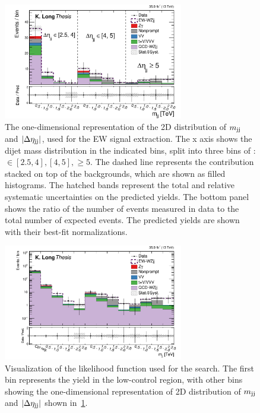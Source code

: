 \begin{figure}[htbp]
  \centering
   \includegraphics[width=0.7\textwidth]{figures/AnalysisProcedure/mjj_etajj_unrolled_Expected.pdf}\qquad
  \caption{
    The one-dimensional representation of the 2D distribution of 
    $m_{\mathrm{jj}}$ and $\left|\Delta\eta_{\mathrm{jj}}\right|$, used for the EW 
    signal extraction. The x axis shows the dijet mass distribution
    in the indicated bins, split into three bins of {\etajj }: {\etajj} $\in [2.5, 4], [4, 5], \ge 5$.
    The dashed line represents the \EWWZ contribution stacked
    on top of the backgrounds, which are shown as filled histograms. 
    The hatched bands represent the total and relative 
    systematic uncertainties on the predicted yields.
    The bottom panel shows the ratio of the number of events measured in data to the total 
    number of expected events. 
    The predicted yields are shown with their best-fit normalizations.
}
\label{fig:2DfitDistribution}
\end{figure}

\begin{figure}[htbp]
  \centering
   \includegraphics[width=0.7\textwidth]{figures/AnalysisProcedure/mjj_etajj_unrolled_wCR_Expected.pdf}\qquad
  \caption{
    Visualization of the likelihood function used for the \EWWZ search.
    The first bin represents the yield in the low-\mjj control region,
    with other bins showing the one-dimensional representation of
    2D distribution of 
    $m_{\mathrm{jj}}$ and $\left|\Delta\eta_{\mathrm{jj}}\right|$ shown in~\ref{fig:2DfitDistribution}.
}
\label{fig:2DfitDistributionWCR}
\end{figure}

